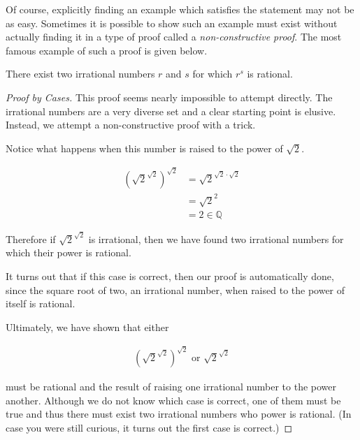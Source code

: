 Of course, explicitly finding an example which satisfies the statement may not be as easy. Sometimes it is possible to show such an example must exist without actually finding it in a type of proof called a \emph{non-constructive proof}. The most famous example of such a proof is given below.

\vspace{\baselineskip}
\begin{theorem}
	There exist two irrational numbers $r$ and $s$ for which $r^s$ is rational.
\end{theorem}

\begin{proof}[Proof by Cases]
	This proof seems nearly impossible to attempt directly. The irrational numbers are a very diverse set and a clear starting point is elusive. Instead, we attempt a non-constructive proof with a trick.
	
	Notice what happens when this number is raised to the power of $\sqrt{2}$.
	
	\begin{align*}
		\left( \sqrt{2}^{\sqrt{2}} \right)^{\sqrt{2}} &= \sqrt{2}^{\sqrt{2} \cdot \sqrt{2}} \\
		&= \sqrt{2}^2 \\
		&= 2 \in \mathbb{Q}
	\end{align*}
	
	Therefore if $\sqrt{2}^{\sqrt{2}}$ is irrational, then we have found two irrational numbers for which their power is rational.
	
	
	It turns out that if this case is correct, then our proof is automatically done, since the square root of two, an irrational number, when raised to the power of itself is rational.
	
	Ultimately, we have shown that either
	
	\begin{align*}
		\left( \sqrt{2}^{\sqrt{2}} \right)^{\sqrt{2}} \text{ or } \sqrt{2}^{\sqrt{2}}
	\end{align*}
	
	must be rational and the result of raising one irrational number to the power another. Although we do not know which case is correct, one of them must be true and thus there must exist two irrational numbers who power is rational. (In case you were still curious, it turns out the first case is correct.)
\end{proof}
\vspace{\baselineskip}

